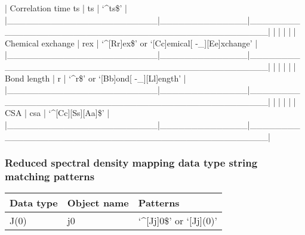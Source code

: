 | Correlation time ts    | ts           | `\^{}ts\$'                                           |
|\_\_\_\_\_\_\_\_\_\_\_\_\_\_\_\_\_\_\_\_\_\_\_\_|\_\_\_\_\_\_\_\_\_\_\_\_\_\_|\_\_\_\_\_\_\_\_\_\_\_\_\_\_\_\_\_\_\_\_\_\_\_\_\_\_\_\_\_\_\_\_\_\_\_\_\_\_\_\_\_\_\_\_\_\_\_\_\_\_|
|                        |              |                                                  |
| Chemical exchange      | rex          | `\^{}[Rr]ex\$' or `[Cc]emical[ -\_][Ee]xchange'       |
|\_\_\_\_\_\_\_\_\_\_\_\_\_\_\_\_\_\_\_\_\_\_\_\_|\_\_\_\_\_\_\_\_\_\_\_\_\_\_|\_\_\_\_\_\_\_\_\_\_\_\_\_\_\_\_\_\_\_\_\_\_\_\_\_\_\_\_\_\_\_\_\_\_\_\_\_\_\_\_\_\_\_\_\_\_\_\_\_\_|
|                        |              |                                                  |
| Bond length            | r            | `\^{}r\$' or `[Bb]ond[ -\_][Ll]ength'                 |
|\_\_\_\_\_\_\_\_\_\_\_\_\_\_\_\_\_\_\_\_\_\_\_\_|\_\_\_\_\_\_\_\_\_\_\_\_\_\_|\_\_\_\_\_\_\_\_\_\_\_\_\_\_\_\_\_\_\_\_\_\_\_\_\_\_\_\_\_\_\_\_\_\_\_\_\_\_\_\_\_\_\_\_\_\_\_\_\_\_|
|                        |              |                                                  |
| CSA                    | csa          | `\^{}[Cc][Ss][Aa]\$'                                 |
|\_\_\_\_\_\_\_\_\_\_\_\_\_\_\_\_\_\_\_\_\_\_\_\_|\_\_\_\_\_\_\_\_\_\_\_\_\_\_|\_\_\_\_\_\_\_\_\_\_\_\_\_\_\_\_\_\_\_\_\_\_\_\_\_\_\_\_\_\_\_\_\_\_\_\_\_\_\_\_\_\_\_\_\_\_\_\_\_\_|




\subsubsection{Reduced spectral density mapping data type string matching patterns}



\begin{center}
\begin{tabular}{lll}
\toprule
Data type & Object name & Patterns \\
\midrule
 J(0)                    &  j0            &  `\^{}[Jj]0\$' or `[Jj](0)'                            \\
\bottomrule
\end{tabular}
\end{center}

